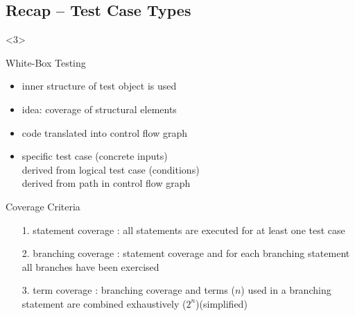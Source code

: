 \subsection{Recap -- Test Case Types}
\begin{frame}<3>{\insertsubsection}
	\small
	\begin{fancycolumns}[animation=none]
		\begin{definition}{White-Box Testing \mysource{\ludewiglichter}} %
			\begin{itemize}
				\setlength\itemsep{.1em}
				\item inner structure of test object is used
				\item idea: coverage of structural elements
				\item code translated into control flow graph
				\item specific test case (concrete inputs)\\derived from logical test case (conditions)\\derived from path in control flow graph
			\end{itemize}
		\end{definition} \pause
		\begin{definition}{Coverage Criteria \mysource{\ludewiglichter}} %
			\begin{itemize}
				\item[1.] statement coverage : all statements are executed for at least one test case
				\item[2.] branching coverage : statement coverage and for each branching statement all branches have been exercised
				\item[3.] term coverage : branching coverage and terms ($n$) used in a branching statement are combined exhaustively ($2^n$)\hfill(simplified)
			\end{itemize}
		\end{definition}


\end{fancycolumns}
\end{frame}
